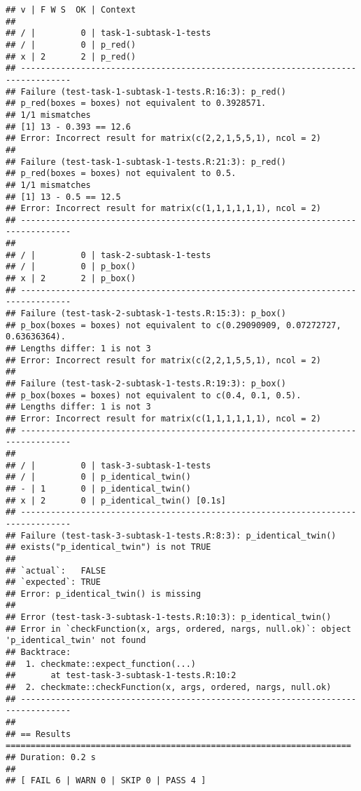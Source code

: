 \documentclass[
]{article}
\begin{document}
\begin{verbatim}
## v | F W S  OK | Context
## 
## / |         0 | task-1-subtask-1-tests                                          
## / |         0 | p_red()                                                         
## x | 2       2 | p_red()
## --------------------------------------------------------------------------------
## Failure (test-task-1-subtask-1-tests.R:16:3): p_red()
## p_red(boxes = boxes) not equivalent to 0.3928571.
## 1/1 mismatches
## [1] 13 - 0.393 == 12.6
## Error: Incorrect result for matrix(c(2,2,1,5,5,1), ncol = 2)
## 
## Failure (test-task-1-subtask-1-tests.R:21:3): p_red()
## p_red(boxes = boxes) not equivalent to 0.5.
## 1/1 mismatches
## [1] 13 - 0.5 == 12.5
## Error: Incorrect result for matrix(c(1,1,1,1,1,1), ncol = 2)
## --------------------------------------------------------------------------------
## 
## / |         0 | task-2-subtask-1-tests                                          
## / |         0 | p_box()                                                         
## x | 2       2 | p_box()
## --------------------------------------------------------------------------------
## Failure (test-task-2-subtask-1-tests.R:15:3): p_box()
## p_box(boxes = boxes) not equivalent to c(0.29090909, 0.07272727, 0.63636364).
## Lengths differ: 1 is not 3
## Error: Incorrect result for matrix(c(2,2,1,5,5,1), ncol = 2)
## 
## Failure (test-task-2-subtask-1-tests.R:19:3): p_box()
## p_box(boxes = boxes) not equivalent to c(0.4, 0.1, 0.5).
## Lengths differ: 1 is not 3
## Error: Incorrect result for matrix(c(1,1,1,1,1,1), ncol = 2)
## --------------------------------------------------------------------------------
## 
## / |         0 | task-3-subtask-1-tests                                          
## / |         0 | p_identical_twin()                                              
## - | 1       0 | p_identical_twin()                                              
## x | 2       0 | p_identical_twin() [0.1s]
## --------------------------------------------------------------------------------
## Failure (test-task-3-subtask-1-tests.R:8:3): p_identical_twin()
## exists("p_identical_twin") is not TRUE
## 
## `actual`:   FALSE
## `expected`: TRUE 
## Error: p_identical_twin() is missing
## 
## Error (test-task-3-subtask-1-tests.R:10:3): p_identical_twin()
## Error in `checkFunction(x, args, ordered, nargs, null.ok)`: object 'p_identical_twin' not found
## Backtrace:
##  1. checkmate::expect_function(...)
##       at test-task-3-subtask-1-tests.R:10:2
##  2. checkmate::checkFunction(x, args, ordered, nargs, null.ok)
## --------------------------------------------------------------------------------
## 
## == Results =====================================================================
## Duration: 0.2 s
## 
## [ FAIL 6 | WARN 0 | SKIP 0 | PASS 4 ]
\end{verbatim}
\end{document}
